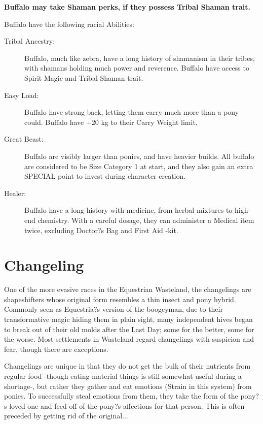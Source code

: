 \documentclass[11pt,a4paper,twocolumn]{book}
\begin{document}
   	\textbf{Buffalo may take Shaman perks, if they possess Tribal Shaman trait.}
   
   	Buffalo have the following racial Abilities:
   	\begin{description}
	   	\item[Tribal Ancestry:] Buffalo, much like zebra, have a long history of shamanism in their tribes, with shamans holding much power and reverence. Buffalo have access to Spirit Magic and Tribal Shaman trait.
	   	\item[Easy Load:] Buffalo have strong back, letting them carry much more than a pony could. Buffalo have +20 kg to their Carry Weight limit.
	   	\item[Great Beast:] Buffalo are visibly larger than ponies, and have heavier builds. All buffalo are considered to be Size Category 1 at start, and they also gain an extra SPECIAL point to invest during character creation.
	   	\item[Healer:] Buffalo have a long history with medicine, from herbal mixtures to high-end chemistry. With a careful dosage, they can administer a Medical item twice, excluding  Doctor?s Bag and First Aid -kit.
	\end{description}

	\clearpage
	
	\section*{Changeling}
	
	One of the more evasive races in the Equestrian Wasteland, the changelings are shapeshifters whose original form resembles a thin insect and pony hybrid. Commonly seen as Equestria?s version of the boogeyman, due to their transformative magic hiding them in plain sight, many independent hives began to break out of their old molds after the Last Day; some for the better, some for the worse. Most settlements in Wasteland regard changelings with suspicion and fear, though there are exceptions.
	
	Changelings are unique in that they do not get the bulk of their nutrients from regular food -though eating material things is still somewhat useful during a shortage-, but rather they gather and eat emotions (Strain in this system) from ponies. To successfully steal emotions from them, they take the form of the pony?s loved one and feed off of the pony?s affections for that person. This is often preceded by getting rid of the original... 
	
\end{document}
